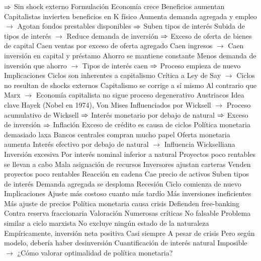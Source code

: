 \documentclass{nuevotema}
\begin{document}
\begin{esquemal}
				\4[] $\then$ Sin shock externo
			\3 Formulación
				\4 Economía crece
				\4[] Beneficios aumentan
				\4 Capitalistas invierten beneficios en K físico
				\4[] Aumenta demanda agregada y empleo
				\4[] $\to$ Agotan fondos prestables disponibles
				\4[] $\then$ Suben tipos de interés
				\4[] Subida de tipos de interés
				\4[] $\to$ Reduce demanda de inversión
				\4[] $\then$ Exceso de oferta de bienes de capital
				\4 Caen ventas por exceso de oferta agregado
				\4[] Caen ingresos
				\4[] $\to$ Caen inversión en capital y préstamo
				\4 Ahorro se mantiene constante
				\4[] Menos demanda de inversión que ahorro
				\4[] $\to$ Tipos de interés caen
				\4[] $\then$ Proceso empieza de nuevo
			\3 Implicaciones
				\4 Ciclos son inherentes a capitalismo
				\4[] Crítica a Ley de Say
				\4[] $\to$ Ciclos no resultan de shocks externos
				\4 Capitalismo se corrige a sí mismo
				\4[] Al contrario que Marx
				\4[] $\to$ Economía capitalista no sigue proceso degenerativo
		\2 Austriacos
			\3 Idea clave
				\4 Hayek (Nobel en 1974), Von Mises
				\4[] Influenciados por Wicksell
				\4[] $\to$ Proceso acumulativo de Wicksell
				\4[] $\then$ Interés monetario por debajo de natural
				\4[] $\then$ Exceso de inversión
				\4[] $\then$ Inflación
				\4 Exceso de crédito es causa de ciclos
				\4 Política monetaria demasiado laxa
				\4[] Bancos centrales compran mucho papel
				\4[] Oferta monetaria aumenta
				\4[] Interés efectivo por debajo de natural
				\4[] $\to$ Influencia Wickselliana
				\4 Inversión excesiva
				\4[] Por interés nominal inferior a natural
				\4[] Proyectos poco rentables se llevan a cabo
				\4[] Mala asignación de recursos
				\4 Inversores ajustan carteras
				\4[] Venden proyectos poco rentables
				\4[] Reacción en cadena
				\4[] Cae precio de activos
				\4[] Suben tipos de interés
				\4[] Demanda agregada se desploma
				\4[$\then$] Recesión
				\4 Ciclo comienza de nuevo
			\3 Implicaciones
				\4 Ajuste más costoso cuanto más tardío
				\4[] Más inversiones ineficientes
				\4[] Más ajuste de precios
				\4 Política monetaria causa crisis
				\4[] Defienden free-banking
				\4[] Contra reserva fraccionaria
			\3 Valoración
				\4 Numerosas críticas
				\4 No falsable
				\4[] Problema similar a ciclo marxista
				\4[] No excluye ningún estado de la naturaleza
				\4 Empíricamente, inversión neta positiva
				\4[] Casi siempre
				\4[] A pesar de crisis
				\4[] Pero según modelo, debería haber desinversión
				\4 Cuantificación de interés natural
				\4[] Imposible
				\4[] $\to$ ¿Cómo valorar optimalidad de política monetaria?

\end{esquemal}
\end{document}
